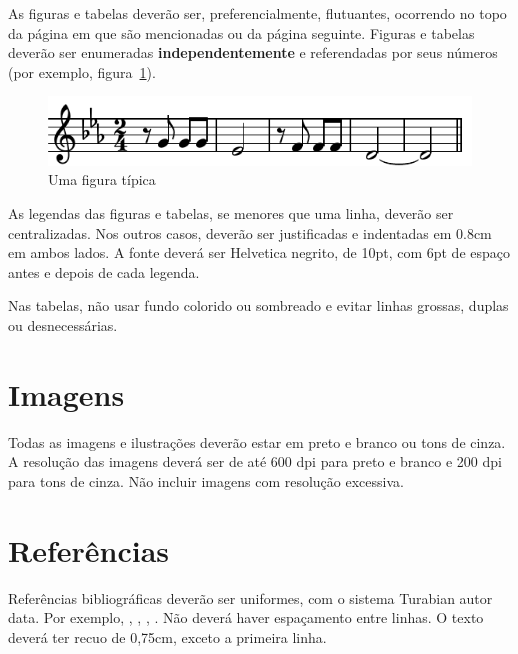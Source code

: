 \documentclass[12pt]{article}
\begin{document}
As figuras e tabelas deverão ser, preferencialmente, flutuantes,
ocorrendo no topo da página em que são mencionadas ou da página
seguinte. Figuras e tabelas deverão ser enumeradas
\textbf{independentemente} e referendadas por seus números (por
exemplo, figura~\ref{fig:exampleFig}).

\begin{figure}
\centering
\includegraphics[width=.5\textwidth]{beethoven}
\caption{Uma figura típica}
\label{fig:exampleFig}
\end{figure}

As legendas das figuras e tabelas, se menores que uma linha, deverão
ser centralizadas. Nos outros casos, deverão ser justificadas e
indentadas em 0.8cm em ambos lados. A fonte deverá ser Helvetica
negrito, de 10pt, com 6pt de espaço antes e depois de cada legenda.

Nas tabelas, não usar fundo colorido ou sombreado e evitar linhas
grossas, duplas ou desnecessárias.


\section{Imagens}

Todas as imagens e ilustrações deverão estar em preto e branco ou tons
de cinza. A resolução das imagens deverá ser de até 600 dpi para preto
e branco e 200 dpi para tons de cinza. Não incluir imagens com
resolução excessiva.

\section{Referências}

Referências bibliográficas deverão ser uniformes, com o sistema
Turabian autor data. Por exemplo, \cite{kroger04:desenvolvendo},
\cite{babbitt61:set}, \cite{coutinho.ea05:computational},
\cite{morris87:composition}. Não deverá haver espaçamento entre
linhas. O texto deverá ter recuo de 0,75cm, exceto a primeira linha.


\end{document}
